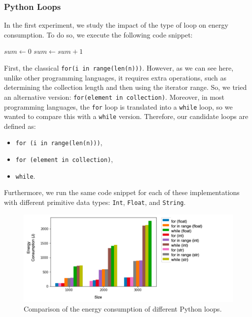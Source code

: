 \subsubsection{Python Loops}
In the first experiment, we study the impact of the type of loop on energy consumption.
To do so, we execute the following code snippet:
\begin{algorithm}[!htb]
    \begin{algorithmic}[1]
        \State $sum \gets 0$
        \State $sum \gets sum+1$
        \EndFor
        \State {}
    \end{algorithmic}
\end{algorithm}

First, the classical \texttt{for(i in range(len(n)))}.
However, as we can see here, unlike other programming languages, it requires extra operations, such as determining the collection length and then using the iterator range.
So, we tried an alternative version: \texttt{for(element in collection)}.
Moreover, in most programming languages, the \texttt{for} loop is translated into a \texttt{while} loop, so we wanted to compare this with a \texttt{while} version.
Therefore, our candidate loops are defined as:
\begin{itemize}[]
    \item \texttt{for (i in range(len(n)))},
    \item \texttt{for (element in collection)},
    \item \texttt{while}.
\end{itemize}

Furthermore, we run the same code snippet for each of these implementations with different primitive data types: \texttt{Int}, \texttt{Float}, and \texttt{String}.

\begin{figure}[!htb]
    \centering
    \includegraphics[width=\linewidth]{imgs/python_iterations}
    \caption{Comparison of the energy consumption of different Python loops.}
    \label{fig:pythonloops}
\end{figure}

